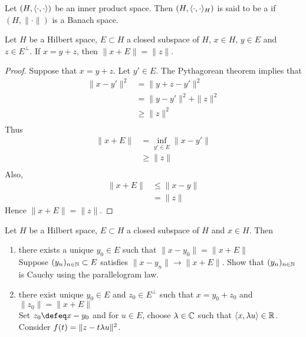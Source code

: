 \documentclass{book}
\begin{document}
\begin{defn} \ld{}
	Let $(H, \langle \cdot, \cdot \rangle)$ be an inner product space. Then $(H, \langle \cdot, \cdot \rangle_H)$ is said to be a  if $(H, \| \cdot \|)$ is a Banach space.
\end{defn}

\begin{ex}
	Let $H$ be a Hilbert space, $E \subset H$ a closed subspace of $H$, $x \in H$, $y \in E$ and $z \in E^{\perp}$. If $x = y + z$, then $\|x + E\| = \|z\|$.
\end{ex}

\begin{proof}
	Suppose that $x = y+z$. Let $y' \in E$. The Pythagorean theorem implies that
	\begin{align*}
		\|x - y'\|^2
		& = \|y + z - y'\|^2 \\
		& = \|y - y'\|^2 + \|z\|^2 \\
		& \geq \|z\|^2 \\
	\end{align*}
	Thus 
	\begin{align*}
		\|x +E\|
		& = \inf_{y' \in E} \|x - y'\| \\
		& \geq \|z\| \\
	\end{align*}
	Also,
	\begin{align*}
		\|x + E\| 
		& \leq \|x - y\| \\ 
		& = \|z\| 
	\end{align*}
	Hence $\|x + E\| = \|z\|$.
\end{proof}

\begin{ex}
	Let $H$ be a Hilbert space, $E \subset H$ a closed subspace of $H$ and $x \in H$. Then 
	\begin{enumerate}
		\item there exists a unique $y_0 \in E$ such that $\|x - y_0\| = \|x+E\|$ \\
		 Suppose $(y_n)_{n \in \mathbb{N}} \subset E$ satisfies $\|x-y_n\| \rightarrow \|x + E\|$. Show that $(y_n)_{n \in \mathbb{N}}$ is Cauchy using the parallelogram law.
		\item there exist unique $y_0\in E$ and $z_0 \in E^{\perp}$ such that $x = y_0 + z_0$ and $\|z_0\| = \|x+E\|$ \\
		 Set $z_0 \defeq x-y_0 $ and for $u \in E$, choose $\lambda \in \mathbb{C}$ such that $\langle x, \lambda u \rangle \in \mathbb{R}$. Consider $f(t) = \|z - t\lambda u\|^2$.
	\end{enumerate}
\end{ex}
\end{document}
